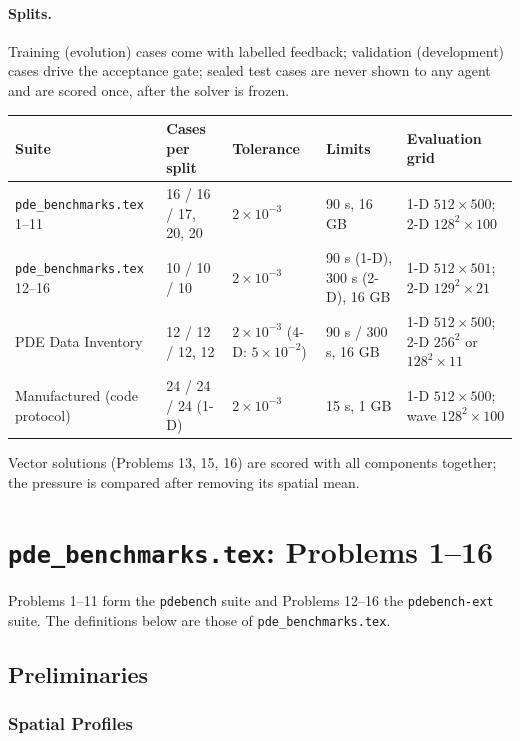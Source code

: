 \documentclass[11pt]{article}
\begin{document}
\paragraph{Splits.} Training (evolution) cases come with labelled feedback; validation (development) cases drive the
acceptance gate; sealed test cases are never shown to any agent and are scored once, after the solver is frozen.
\begin{center}
\small
\begin{tabular}{p{3.3cm}p{2.3cm}p{2.1cm}p{2.4cm}p{3.6cm}}
\toprule
Suite & Cases per split & Tolerance & Limits & Evaluation grid \\
\midrule
\texttt{pde\_benchmarks.tex} 1--11 & 16 / 16 / 17, 20, 20 & $2\times10^{-3}$ & 90 s, 16 GB & 1-D $512\times500$; 2-D $128^2\times100$ \\
\texttt{pde\_benchmarks.tex} 12--16 & 10 / 10 / 10 & $2\times10^{-3}$ & 90 s (1-D), 300 s (2-D), 16 GB & 1-D $512\times501$; 2-D $129^2\times21$ \\
PDE Data Inventory & 12 / 12 / 12, 12 & $2\times10^{-3}$ (4-D: $5\times10^{-2}$) & 90 s / 300 s, 16 GB & 1-D $512\times500$; 2-D $256^2$ or $128^2\times11$ \\
Manufactured (code protocol) & 24 / 24 / 24 (1-D) & $2\times10^{-3}$ & 15 s, 1 GB & 1-D $512\times500$; wave $128^2\times100$ \\
\bottomrule
\end{tabular}
\end{center}
Vector solutions (Problems 13, 15, 16) are scored with all components together; the pressure is compared after removing its spatial mean.
\section{\texttt{pde\_benchmarks.tex}: Problems 1--16}
Problems 1--11 form the \texttt{pdebench} suite and Problems 12--16 the \texttt{pdebench-ext} suite. The definitions below are those of \texttt{pde\_benchmarks.tex}.
\setcounter{subsection}{0}
\renewcommand{\thesubsection}{\arabic{subsection}}
\subsection{Preliminaries}

\subsubsection*{Spatial Profiles}
\end{document}
